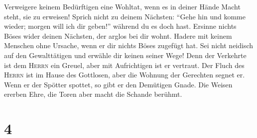  Verweigere keinem Bedürftigen eine Wohltat, wenn es in
deiner Hände Macht steht, sie zu erweisen!  Sprich nicht
zu deinem Nächsten: ``Gehe hin und komme wieder; morgen will ich dir
geben!'' während du es doch hast.  Ersinne nichts Böses
wider deinen Nächsten, der arglos bei dir wohnt.  Hadere
mit keinem Menschen ohne Ursache, wenn er dir nichts Böses zugefügt hat.
 Sei nicht neidisch auf den Gewalttätigen und erwähle dir
keinen seiner Wege!  Denn der Verkehrte ist dem
\textsc{Herrn} ein Greuel, aber mit Aufrichtigen ist er vertraut.
 Der Fluch des \textsc{Herrn} ist im Hause des Gottlosen,
aber die Wohnung der Gerechten segnet er.  Wenn er der
Spötter spottet, so gibt er den Demütigen Gnade.  Die
Weisen ererben Ehre, die Toren aber macht die Schande berühmt.

\hypertarget{section-3}{%
\section{4}\label{section-3}}

